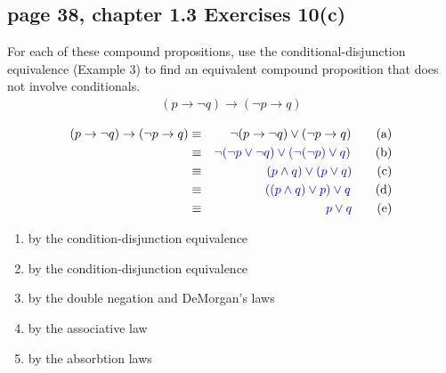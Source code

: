 \documentclass[sigconf]{acmart}
\newcommand{\answer}[2]{%
  \if\relax\detokenize{#2}\relax
    \underline{\mbox{請作答}}%
  \else
    \textcolor{blue}{#2}%
  \fi
}
\begin{document}
\subsection{page 38, chapter 1.3 Exercises 10(c)}
\begin{shaded}
    For each of these compound propositions, use the conditional-disjunction equivalence (Example 3) to find an equivalent compound proposition that does not involve conditionals.
    \begin{eqnarray*}
    	(p \rightarrow \neg q) \rightarrow (\neg p \rightarrow q)
    \end{eqnarray*}
\end{shaded}  
\begin{align*}
	(p \rightarrow \neg q) \rightarrow (\neg p \rightarrow q) 
	& \equiv & \neg (p \rightarrow \neg q) \lor (\neg p \rightarrow q ) \tag{a} \\ 
    & \equiv & \answer{1.3.10c.b}{\neg(\neg p \lor \neg q) \lor (\neg(\neg p) \lor q)} \tag{b} \\  
	  & \equiv & \answer{1.3.10c.c}{(p \land q) \lor (p \lor q)} \tag{c}\\
	  & \equiv & \answer{1.3.10c.d}{((p \land q) \lor p) \lor q} \tag{d}\\ 
	  & \equiv & \answer{1.3.10c.e}{p \lor q} \tag{e}
\end{align*}
\begin{enumerate}[label=(\alph*)]
    \item by the condition-disjunction equivalence
	\item by the condition-disjunction equivalence
	\item by the double negation and DeMorgan's laws
	\item by the associative law
	\item by the absorbtion laws
\end{enumerate}
\end{document}
